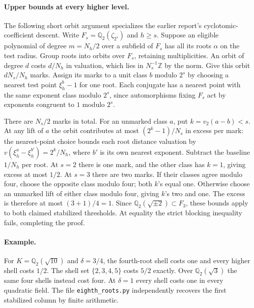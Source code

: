 \paragraph{Upper bounds at every higher level.}
The following short orbit argument specializes the earlier report's
cyclotomic-coefficient descent. Write $F_s=\mathbb Q_2(\zeta_{2^s})$
and $h\ge s$. Suppose an eligible polynomial of degree $m=N_h/2$ over
a subfield of $F_s$ has all its roots $\alpha$ on the test radius.
Group roots into orbits over $F_s$, retaining multiplicities. An orbit of
degree $d$ costs $d/N_h$ in valuation, which lies in
$N_s^{-1}\mathbb Z$ by the norm. Give this orbit
$dN_s/N_h$ marks. Assign its marks to a unit class $b$ modulo $2^s$ by
choosing a nearest test point $\xi_h^b-1$ for one root. Each conjugate
has a nearest point with the same exponent class modulo $2^s$, since
automorphisms fixing $F_s$ act by exponents congruent to $1$ modulo $2^s$.

There are $N_s/2$ marks in total. For an unmarked class $a$, put
$k=v_2(a-b)<s$. At any lift of $a$ the orbit contributes at most
$(2^k-1)/N_s$ in excess per mark: the nearest-point choice bounds each
root distance valuation by $v(\xi_h^a-\xi_h^{b'})=2^k/N_h$,
where $b'$ is its own nearest exponent. Subtract the baseline $1/N_h$
per root. At $s=2$ there is one mark, and the other class has $k=1$,
giving excess at most $1/2$. At $s=3$ there are two marks. If their
classes agree modulo four, choose the opposite class modulo four;
both $k$'s equal one. Otherwise choose an unmarked lift of either class
modulo four, giving $k$'s two and one. The excess is therefore at most
$(3+1)/4=1$. Since $\mathbb Q_2(\sqrt{\pm2})\subset F_3$,
these bounds apply to both claimed stabilized thresholds. At equality the
strict blocking inequality fails, completing the proof.

\paragraph{Example.}
For $K=\mathbb Q_2(\sqrt{10})$ and $\delta=3/4$, the fourth-root
shell costs one and every higher shell costs $1/2$. The shell set
$\{2,3,4,5\}$ costs $5/2$ exactly. Over $\mathbb Q_2(\sqrt3)$ the
same four shells instead cost four. At $\delta=1$ every shell costs
one in every quadratic field. The file \texttt{eighth\_roots.py}
independently recovers the first stabilized column by finite arithmetic.

